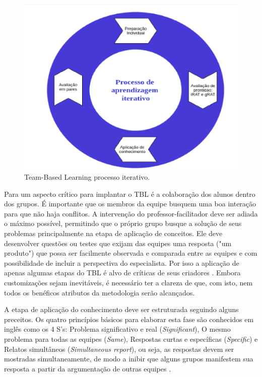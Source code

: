 \begin{figure}[h!]
	\centering
  \includegraphics[keepaspectratio=true,scale=0.5]{figuras/tbl1.eps}
  \caption{Team-Based Learning processo iterativo.}
	\label{fig:tbl1}
\end{figure}

Para \cite{bollela} um aspecto crítico para implantar o TBL é a colaboração dos alunos dentro dos grupos. É importante que os membros da equipe busquem uma boa interação para que não haja conflitos. A intervenção do professor-facilitador deve ser adiada o máximo possível, permitindo que o próprio grupo busque a solução de seus problemas principalmente na etapa de aplicação de conceitos. Ele deve desenvolver questões ou testes que exijam das equipes uma resposta ("um produto") que possa ser facilmente observada e comparada entre as equipes e com possibilidade de incluir a perspectiva do especialista. Por isso a aplicação de apenas algumas etapas do TBL é alvo de críticas de seus criadores \cite{sweet}. Embora customizações sejam inevitáveis, é necessário ter a clareza de que, com isto, nem todos os benéficos atributos da metodologia serão alcançados.

A etapa de aplicação do conhecimento deve ser estruturada seguindo alguns preceitos. Os quatro princípios básicos para elaborar esta fase são conhecidos em inglês como os 4 S’s: Problema significativo e real (\textit{Significant}), O mesmo problema para todas as equipes (\textit{Same}), Respostas curtas e específicas (\textit{Specific}) e Relatos simultâneos (\textit{Simultaneous report}), ou seja, as respostas devem ser mostradas simultaneamente, de modo a inibir que alguns grupos manifestem sua resposta a partir da argumentação de outras equipes \cite{bollela}.

